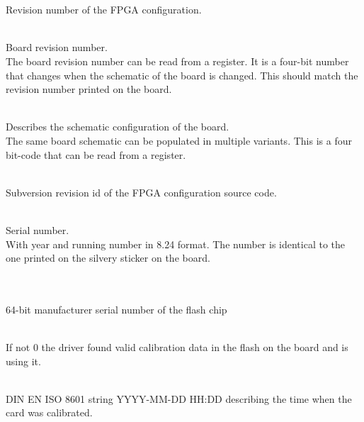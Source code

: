 \\


\\
Revision number of the FPGA configuration.

\\
Board revision number.\\
The board revision number can be read from a register. It is a four-bit number that changes when the schematic of the board is changed. This should match the revision number printed on the board.

\\
Describes the schematic configuration of the board.\\
The same board schematic can be populated in multiple variants. This is a four bit-code that can be read from a register.

\\
Subversion revision id of the FPGA configuration source code.

\par

\\
Serial number.\\
With year and running number in 8.24 format. The number is identical to the one printed on the silvery sticker on the board.\par

\\
\\
64-bit manufacturer serial number of the flash chip

\\
If not 0 the driver found valid calibration data in the flash on the board and is using it.\par

\\
DIN EN ISO 8601 string YYYY-MM-DD HH:DD describing the time when the card was calibrated.

